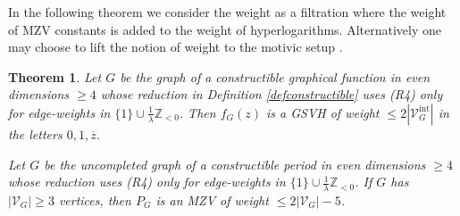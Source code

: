 \documentclass[oneside]{amsart}
\newcommand{\ZZ}{{\mathbb Z}}
\newcommand{\zz}{{\overline{z}}}
\newcommand{\sV}{\mathcal{V}}
\newcommand{\sVGint}{{\sV_G^\mathrm{int}}}
\newcommand{\VGint}{{|\sVGint|}}
\theoremstyle{plain}
\newtheorem{thm}{Theorem}
\begin{document}
In the following theorem we consider the weight as a filtration where the weight of MZV constants is added to the weight of hyperlogarithms.
Alternatively one may choose to lift the notion of weight to the motivic setup \cite{Bcoact2}.
\begin{thm}\label{conthm}
Let $G$ be the graph of a constructible graphical function in even dimensions $\geq4$ whose reduction in Definition \ref{defconstructible} uses (R4) only
for edge-weights in $\{1\}\cup\frac1\lambda\ZZ_{<0}$. Then $f_G(z)$ is a GSVH of weight $\leq2\VGint$ in the letters $0, 1, \zz$.

Let $G$ be the uncompleted graph of a constructible period in even dimensions $\geq4$ whose reduction uses (R4) only for edge-weights in $\{1\}\cup\frac1\lambda\ZZ_{<0}$.
If $G$ has $|\sV_G|\geq3$ vertices, then $P_G$ is an MZV of weight $\leq2|\sV_G|-5$.
\end{thm}
\end{document}
